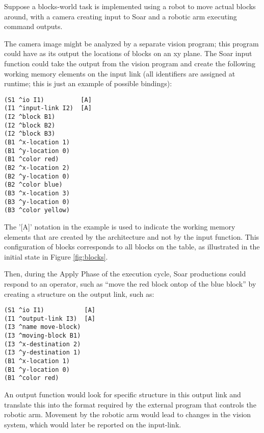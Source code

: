 Suppose a blocks-world task is implemented using a robot to move
actual blocks around, with a camera creating input to Soar and a robotic arm
executing command outputs. 
\begin{figure}
\label{fig:blocks-inputlink}
\end{figure}
The camera image might be analyzed by a separate vision program; this program
could have as its output the locations of blocks on an xy plane.  
The Soar input function could take the
output from the vision program and create the following working memory
elements on the input link (all identifiers are assigned at runtime; 
this is just an example of possible bindings):

\begin{verbatim}
(S1 ^io I1)          [A]
(I1 ^input-link I2)  [A]
(I2 ^block B1)
(I2 ^block B2)
(I2 ^block B3)
(B1 ^x-location 1)
(B1 ^y-location 0)
(B1 ^color red)
(B2 ^x-location 2)
(B2 ^y-location 0)
(B2 ^color blue)
(B3 ^x-location 3)
(B3 ^y-location 0)
(B3 ^color yellow)
\end{verbatim} \vspace{12pt}

The '[A]' notation in the example is used to indicate the working memory
elements that are created by the architecture and not by the input function.
This configuration of blocks corresponds to all blocks on the table, as
illustrated in the initial state in Figure \ref{fig:blocks}.

\begin{figure}
\label{fig:blocks-outputlink}
\end{figure}

Then, during the Apply Phase of the execution cycle, Soar productions could 
respond to an operator, such as ``move the red block
ontop of the blue block'' by creating a structure on the output link, such as:

\begin{verbatim}
(S1 ^io I1)           [A]
(I1 ^output-link I3)  [A]
(I3 ^name move-block)
(I3 ^moving-block B1)
(I3 ^x-destination 2)
(I3 ^y-destination 1)
(B1 ^x-location 1)
(B1 ^y-location 0)
(B1 ^color red)
\end{verbatim}  \vspace{12pt}

An output function would look for specific structure in this output link and
translate this into the format required by the external program that controls
the robotic arm. Movement by the robotic arm would lead to changes in the 
vision system, which would later be reported on the input-link.

